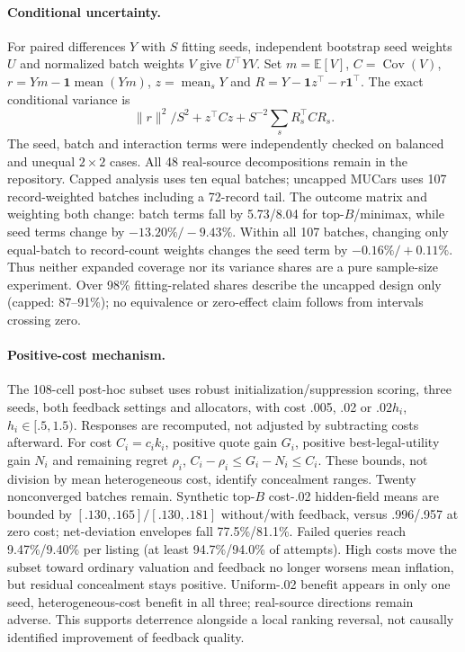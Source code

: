 \documentclass[11pt]{article}
\begin{document}
\paragraph{Conditional uncertainty.}
For paired differences $Y$ with $S$ fitting seeds, independent bootstrap seed weights
$U$ and normalized batch weights $V$ give $U^\top YV$. Set
$m=\mathbb E[V]$, $C=\operatorname{Cov}(V)$,
$r=Ym-\mathbf1\operatorname{mean}(Ym)$, $z=\operatorname{mean}_sY$ and
$R=Y-\mathbf1z^\top-r\mathbf1^\top$. The exact conditional variance is
\[
 \|r\|^2/S^2+z^\top Cz+S^{-2}\sum_sR_s^\top CR_s.
\]
The seed, batch and interaction terms were independently checked on balanced
and unequal $2\times2$ cases. All 48 real-source decompositions remain in
the repository. Capped analysis uses ten equal batches; uncapped MUCars uses
107 record-weighted batches including a 72-record tail. The outcome matrix
and weighting both change: batch terms fall by 5.73/8.04 for top-$B$/minimax,
while seed terms change by $-13.20\%/-9.43\%$. Within all 107 batches, changing
only equal-batch to record-count weights changes the seed term by
$-0.16\%/+0.11\%$. Thus neither expanded coverage nor its variance shares
are a pure sample-size experiment. Over 98\% fitting-related shares describe
the uncapped design only (capped: 87--91\%); no equivalence or zero-effect
claim follows from intervals crossing zero.

\paragraph{Positive-cost mechanism.}
The 108-cell post-hoc subset uses robust initialization/suppression scoring,
three seeds, both feedback settings and allocators, with cost .005, .02 or
$.02h_i$, $h_i\in[.5,1.5)$. Responses are recomputed, not adjusted by
subtracting costs afterward. For cost $C_i=c_i k_i$, positive quote gain
$G_i$, positive best-legal-utility gain $N_i$ and remaining regret $\rho_i$,
$C_i-\rho_i\le G_i-N_i\le C_i$. These bounds, not division by mean
heterogeneous cost, identify concealment ranges. Twenty nonconverged batches
remain. Synthetic top-$B$ cost-.02 hidden-field means are bounded by
$[.130,.165]/[.130,.181]$ without/with feedback, versus .996/.957 at zero cost;
net-deviation envelopes fall 77.5\%/81.1\%. Failed queries reach 9.47\%/9.40\%
per listing (at least 94.7\%/94.0\% of attempts). High costs move the subset
toward ordinary valuation and feedback no longer worsens mean inflation,
but residual concealment stays positive. Uniform-.02 benefit appears in only
one seed, heterogeneous-cost benefit in all three; real-source directions
remain adverse. This supports deterrence alongside a local ranking reversal,
not causally identified improvement of feedback quality.
\end{document}
